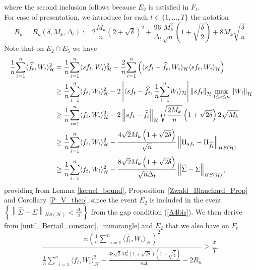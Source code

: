 \documentclass[twoside,11pt]{article}
\newcommand{\Hk}{\mathcal{H}}
\newcommand{\HSk}{HS(\mathcal{H})}
\newcommand{\nb}{n}
\begin{document}
where the second inclusion follows because $E_2$ is satisfied in $F_t$. \\
For ease of presentation, we introduce for each $t \in \{1,\ldots,T\}$ the notation
$$R_{\nb} =  R_{\nb}\left(\delta,M_k,\Delta_t\right) := 
2\frac{M_k}{\nb} \left( 2 + \sqrt{\delta} \right)^2  + \frac{96}{\Delta_t}  \frac{M_k^2}{\sqrt{\nb}} \left( 1 + \sqrt{\frac{\delta}{2}} \right) +   8 M_k \sqrt{\frac \delta \nb}.
$$
Note that on $  E_2    \cap E_5 $ we have 
\begin{align}
\frac{1}{\nb} \underset{i=1}{\overset{\nb}{\sum}}  \langle \widehat{f}_t , W_i \rangle_{\Hk}^2 & = 
\frac{1}{\nb} \underset{i=1}{\overset{\nb}{\sum}} \langle s f_t , W_i \rangle_{\Hk}^2 - \frac{2}{\nb} \underset{i=1}{\overset{\nb}{\sum}} \left( \langle s f_t - \widehat{f}_t, W_i \rangle_{\Hk} \langle s f_t, W_i \rangle_{\Hk} \right)  \notag \\
& \geq \frac{1}{\nb} \underset{i=1}{\overset{\nb}{\sum}} \langle f_t , W_i \rangle_{\Hk}^2 -  2 \left | \langle s f_t - \widehat{f}_t, \frac{1}{\nb} \underset{i=1}{\overset{\nb}{\sum}} W_i \rangle_{\Hk} \right | \left \| s 	f_t \right \|_{\Hk}  \underset{ 1\leq i \leq \nb}{\max} \left \| W_i \right \|_{\Hk} \notag  \\
 & \geq  \frac{1}{\nb} \underset{i=1}{\overset{\nb}{\sum}} \langle f_t , W_i \rangle_{\Hk}^2  -  2 \left \| s f_t - \widehat{f}_t \right \|_{\Hk} \sqrt{\frac{2 M_k}{\nb}} \left(1+\sqrt{2\delta}\right) 2 \sqrt{M_k} \notag  \\
 & \geq \frac{1}{\nb} \underset{i=1}{\overset{\nb}{\sum}} \langle f_t , W_i \rangle_{\Hk}^2 -  \frac{4 \sqrt{2} M_k \left(1 +\sqrt{2\delta} \right)}{\sqrt{\nb}} \left \| \Pi_{s f_t} - \Pi_{\widehat{f}_t} \right \|_{\HSk} \notag  \\
  & \geq \frac{1}{\nb} \underset{i=1}{\overset{\nb}{\sum}} \langle f_t , W_i \rangle_{\Hk}^2 -  \frac{8 \sqrt{2} M_k \left(1 +\sqrt{2\delta} \right)}{\sqrt{\nb} \Delta_t} \left \| \widehat{\Sigma} - \Sigma \right \|_{\HSk},  \label{minorangle}
\end{align}
providing from Lemma \ref{kernel_bound}, Proposition~\ref{Zwald_Blanchard_Prop} and Corollary \ref{P_V_theo}, since the event $E_2$ is included in the event $ \left \{ \left \| \widehat{\Sigma} - \Sigma \right \|_{\HSk} < \frac{\Delta_t}{2} \right \}$ from  the gap condition (\ref{A4bis}). We then derive from \eqref{until_Bertail_constant}, \eqref{minorangle} and $E_2$ that we also have on $F_t$
$$
  \frac{\nb \left(  \frac{1}{\nb} \underset{i=1}{\overset{\nb}{\sum}} \langle \widehat{f}_t , W_i \rangle_{\Hk} \right)^2}{\frac{1}{\nb} \underset{i=1}{\overset{\nb}{\sum}} \langle f_t , W_i \rangle_{\Hk}^2 - \frac{48 \sqrt{2} M_k^2 \left(1+ \sqrt{2\delta}\right) \left(1+ \sqrt{\frac{\delta}{2}}\right)}{\nb \Delta_t} - 2 R_{\nb}}  > \frac{x}{T}  ,
  $$
\end{document}
